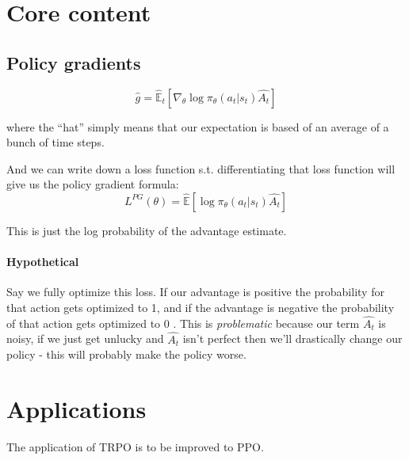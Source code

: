 \documentclass{article}
\begin{document}
\section[high]{Core content}

\subsection{Policy gradients}
\[\hat{g} = \hat{\mathbb{E}}_t \left [ \nabla_\theta \log{\pi_\theta} (a_t|s_t) \hat{A_t}  \right] \]

where the ``hat'' simply means that our expectation is based of an average of a bunch of time steps.

And we can write down a loss function s.t. differentiating that loss function will give us the policy gradient formula:
\[ L^{PG}(\theta) = \hat{\mathbb{E}} \left[  \log{\pi_\theta} (a_t|s_t) \hat{A_t} \right] \]

This is just the log probability of the advantage estimate.

\paragraph{Hypothetical} Say we fully optimize this loss. If our advantage is positive the probability for that action gets optimized to 1, and if the advantage is negative the probability of that action gets optimized to 0
. This is \emph{problematic} because our term \(\hat{A_t}\) is noisy, if we just get unlucky and \(\hat{A_t}\) isn't perfect then we'll drastically change our policy - this will probably make the policy worse.

\section[high]{Applications}
The application of TRPO is to be improved to PPO. 
\end{document}
